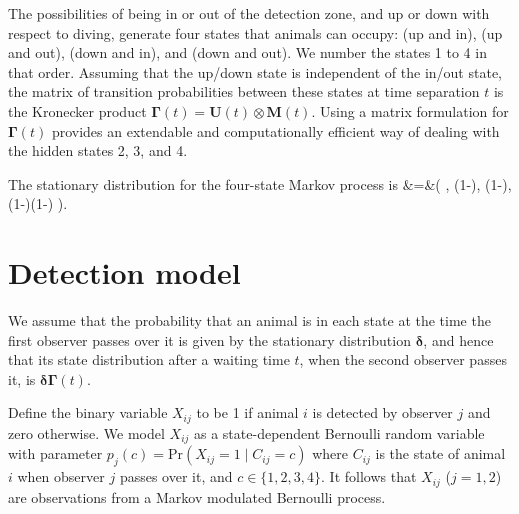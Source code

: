 \documentclass[useAMS, usenatbib, referee]{biom}\usepackage[]{graphicx}\usepackage[]{color}
\begin{document}
The possibilities of being in or out of the detection zone, and up or down with respect to diving, generate four states that animals can occupy: (up and in), (up and out), (down and in), and (down and out). We number the states 1 to 4 in that order. Assuming that the up/down state is independent of the in/out state, the matrix of transition probabilities between these states at time separation $t$ is the Kronecker product $\bm{\Gamma}(t)=\bm{U}(t)\otimes\bm{M}(t)$. Using a matrix formulation for $\bm{\Gamma}(t)$ provides an extendable and computationally efficient way of dealing with the hidden states 2, 3, and 4.



The stationary distribution for the four-state Markov process is
\be
\bm{\delta}&=&\Bigg(
\gamma{},\;
\gamma\left(1-\right),\;
\left(1-\gamma\right),\;
\left(1-\gamma\right)\left(1-\right)
\Bigg).
\label{eq:delta}
\ee



\section{Detection model}

We assume that the probability that an animal is in each state at the time the first observer passes over it is given by the stationary distribution $\bm{\delta}$, and hence that its state distribution after a waiting time $t$, when the second observer passes it, is $\bm{\delta}\bm{\Gamma}(t)$.

Define the binary variable $X_{ij}$ to be 1 if animal $i$ is detected by observer $j$ and zero otherwise. We model $X_{ij}$ as a state-dependent Bernoulli random variable with parameter $p_j(c)=\mbox{Pr}(X_{ij}=1\mid C_{ij}=c)$ where $C_{ij}$ is the state of animal $i$ when observer $j$ passes over it, and $c\in \{1,2,3,4\}$.
It follows that $X_{ij}$ ($j=1,2$) are observations from a Markov modulated Bernoulli process.

\end{document}
